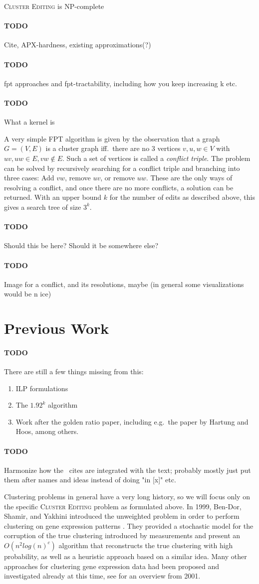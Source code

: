 \documentclass{article}
\newcommand{\todo}[1]{\paragraph{TODO} #1}
\begin{document}
\textsc{Cluster Editing} is NP-complete
\todo Cite, APX-hardness, existing approximations(?)

\todo fpt approaches and fpt-tractability, including how you keep increasing k etc.
\todo What a kernel is

A very simple FPT algorithm is given by the observation that a graph $G = (V, E)$ is a cluster graph
iff.\ there are no 3 vertices $v, u, w \in V$ with $uv, uw \in E, vw \notin E$. Such a set of
vertices is called a \emph{conflict triple}. The problem can be solved by recursively searching for
a conflict triple and branching into three cases: Add $vw$, remove $uv$, or remove $uw$. These are
the only ways of resolving a conflict, and once there are no more conflicts, a solution can be
returned. With an upper bound $k$ for the number of edits as described above, this gives a search
tree of size $3^k$.

\todo Should this be here? Should it be somewhere else?

\todo Image for a conflict, and its resolutions, maybe (in general some visualizations would be
n ice)


\section{Previous Work}

\todo There are still a few things missing from this: \begin{enumerate}
	\item ILP formulations
	\item The $1.92^k$ algorithm
	\item Work after the golden ratio paper, including e.g.\ the paper by Hartung and Hoos, among
		others.
\end{enumerate}

\todo Harmonize how the \ cites are integrated with the text; probably mostly just put them after
names and ideas instead of doing "in [x]" etc.

Clustering problems in general have a very long history, so we will focus only on the specific
\textsc{Cluster Editing} problem as formulated above. In 1999, Ben-Dor, Shamir, and Yakhini
introduced the unweighted problem in order to perform clustering on gene expression patterns
\cite{BenDor}. They provided a stochastic model for the corruption of the true clustering introduced
by measurements and present an $O(n^2 log(n)^c)$ algorithm that reconstructs the true clustering
with high probability, as well as a heuristic approach based on a similar idea. Many other
approaches for clustering gene expression data had been proposed and investigated already at this
time, see \cite{ShamirOverview} for an overview from 2001.
\end{document}
